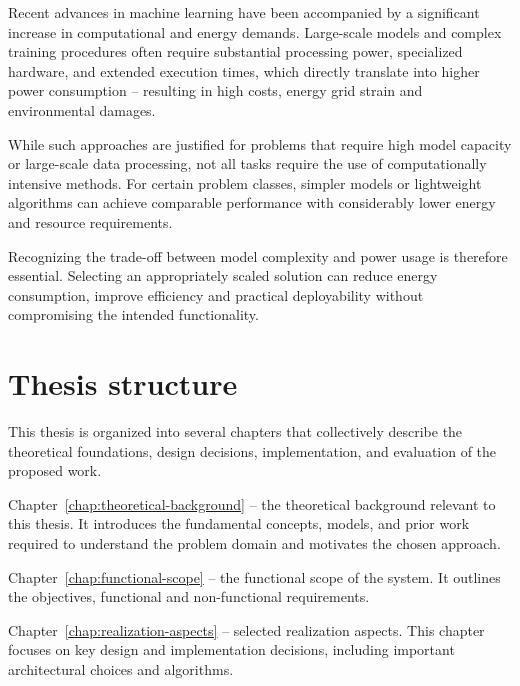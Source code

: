 \documentclass[english]{aghengthesis} %
\begin{document}
\par Recent advances in machine learning have been accompanied by a significant increase in computational and energy demands. Large-scale models and complex training procedures often require substantial processing power, specialized hardware, and extended execution times, which directly translate into higher power consumption -- resulting in high costs, energy grid strain and environmental damages.\\

\par While such approaches are justified for problems that require high model capacity or large-scale data processing, not all tasks require the use of computationally intensive methods. For certain problem classes, simpler models or lightweight algorithms can achieve comparable performance with considerably lower energy and resource requirements.\\

\par Recognizing the trade-off between model complexity and power usage is therefore essential. Selecting an appropriately scaled solution can reduce energy consumption, improve efficiency and practical deployability without compromising the intended functionality.\\

\section{Thesis structure}
This thesis is organized into several chapters that collectively describe the theoretical foundations, design decisions, implementation, and evaluation of the proposed work. \\

\par Chapter~\ref{chap:theoretical-background} -- the theoretical background relevant to this thesis. It introduces the fundamental concepts, models, and prior work required to understand the problem domain and motivates the chosen approach. \\

\par Chapter~\ref{chap:functional-scope} -- the functional scope of the system. It outlines the objectives, functional and non-functional requirements. \\

\par Chapter~\ref{chap:realization-aspects} -- selected realization aspects. This chapter focuses on key design and implementation decisions, including important architectural choices and algorithms. \\
\end{document}
